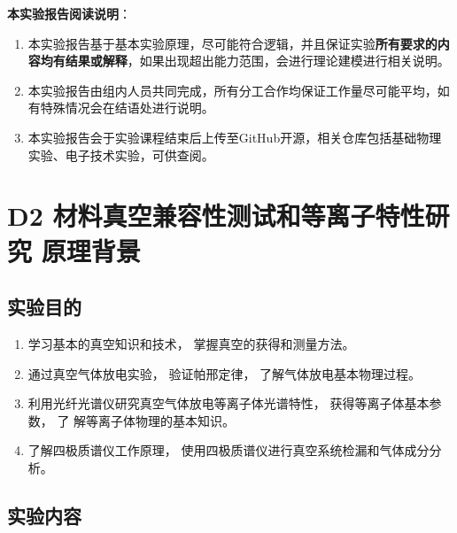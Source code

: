 \documentclass[dvipsnames, svgnames,a4paper,11pt]{article}
\begin{document}
		
	
		
	

	
		
	 \textbf{本实验报告阅读说明}：
		\begin{enumerate}
			\item 本实验报告基于基本实验原理，尽可能符合逻辑，并且保证实验\textbf{所有要求的内容均有结果或解释}，如果出现超出能力范围，会进行理论建模进行相关说明。
			\item 本实验报告由组内人员共同完成，所有分工合作均保证工作量尽可能平均，如有特殊情况会在结语处进行说明。
			\item 本实验报告会于实验课程结束后上传至GitHub开源，相关仓库包括基础物理实验、电子技术实验，可供查阅。
		\end{enumerate}
	\clearpage
	\tableofcontents
	\clearpage
	
	
	
	
	\setcounter{section}{0}
	\section{D2 材料真空兼容性测试和等离子特性研究 \quad\heiti 原理背景}
	
	\subsection{实验目的}
	
\begin{enumerate}
	\item 学习基本的真空知识和技术， 掌握真空的获得和测量方法。
	\item 通过真空气体放电实验， 验证帕邢定律， 了解气体放电基本物理过程。
	\item 利用光纤光谱仪研究真空气体放电等离子体光谱特性， 获得等离子体基本参数， 了
	解等离子体物理的基本知识。
	\item 了解四极质谱仪工作原理， 使用四极质谱仪进行真空系统检漏和气体成分分析。
\end{enumerate}

\subsection{实验内容}
\end{document}
